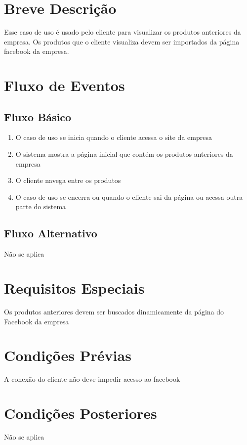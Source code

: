 \section{Breve Descrição}

Esse caso de uso é usado pelo cliente para visualizar os produtos anteriores da empresa. Os produtos que o cliente visualiza devem ser importados da página facebook da empresa.


\section{Fluxo de Eventos}
\subsection{Fluxo Básico}

\begin{enumerate}
	\item O caso de uso se inicia quando o cliente acessa o site da empresa
	\item O sistema mostra a página inicial que contém os produtos anteriores da empresa
	\item O cliente navega entre os produtos
	\item O caso de uso se encerra ou quando o cliente sai da página ou acessa outra parte do sistema

\end{enumerate}

\subsection{Fluxo Alternativo}

Não se aplica

\section{Requisitos Especiais}

Os produtos anteriores devem ser buscados dinamicamente da página do Facebook da empresa

\section{Condições Prévias}

A conexão do cliente não deve impedir acesso ao facebook 

\section{Condições Posteriores}

Não se aplica